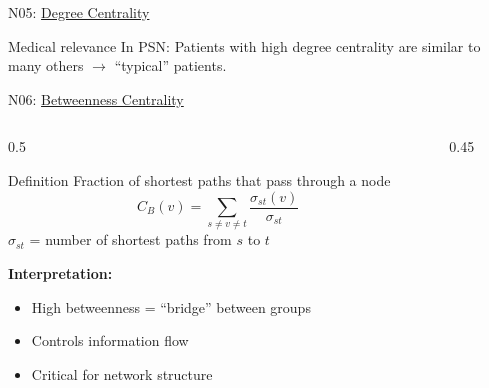 \documentclass[aspectratio=169, 10pt]{beamer}
\begin{document}
\begin{frame}{N05: \href{https://en.wikipedia.org/wiki/Degree_centrality}{Degree Centrality}}
    \vspace{1mm}
    
    \begin{block}{\footnotesize Medical relevance}
        \footnotesize In PSN: Patients with high degree centrality are similar to many others $\rightarrow$ ``typical'' patients.
    \end{block}
    
\end{frame}

\begin{frame}{N06: \href{https://en.wikipedia.org/wiki/Betweenness_centrality}{Betweenness Centrality}}
    
    \begin{columns}
        \begin{column}{0.5\textwidth}
            \begin{block}{Definition}
                Fraction of shortest paths that pass through a node
                \[
                C_B(v) = \sum_{s \neq v \neq t} \frac{\sigma_{st}(v)}{\sigma_{st}}
                \]
                $\sigma_{st}$ = number of shortest paths from $s$ to $t$
            \end{block}
            
            \vspace{2mm}
            
            \textbf{Interpretation:}
            \begin{itemize}
                \item High betweenness = ``bridge'' between groups
                \item Controls information flow
                \item Critical for network structure
            \end{itemize}
        \end{column}
        
        \begin{column}{0.45\textwidth}
            \begin{center}
\end{center}
\end{column}
\end{columns}
\end{frame}
\end{document}
